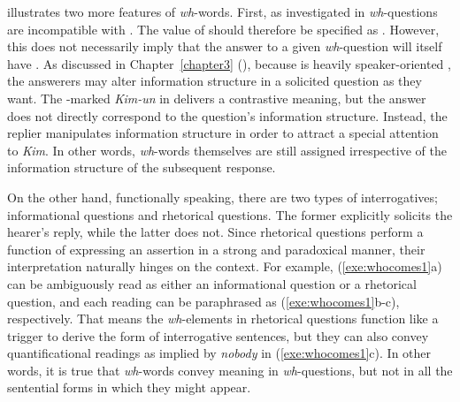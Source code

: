  illustrates two more features of
\textit{wh}-words. First, as investigated in \citet{gryllia:09}
\textit{wh}-questions are incompatible with .  The
value of  should therefore be specified as
.  However, this does not necessarily imply that
the answer to a given \textit{wh}-question will itself have
.  As discussed in Chapter~\ref{chapter3}
(), because  is heavily
speaker-oriented \citep{chang:02}, the answerers may alter information
structure in a solicited question as they want.  The \nun-marked
\textit{Kim-un} in  delivers a contrastive
meaning, but the answer does not directly correspond to the question's
information structure. Instead, the replier manipulates information
structure in order to attract a special attention to \textit{Kim}. In
other words, \textit{wh}-words themselves are still assigned
 irrespective of the information structure of the
subsequent response.




On the other hand, functionally speaking, there are two types of
interrogatives; informational questions and rhetorical questions. The
former explicitly solicits the hearer's reply, while the latter does
not. Since rhetorical questions perform a function of expressing an
assertion in a strong and paradoxical manner, their interpretation
naturally hinges on the context. For example, (\ref{exe:whocomes1}a)
can be ambiguously read as either an informational question or a
rhetorical question, and each reading can be paraphrased as
(\ref{exe:whocomes1}b-c), respectively. That means the
\textit{wh}-elements in rhetorical questions function like a trigger
to derive the form of interrogative sentences,
but they can also convey quantificational readings as implied by
\textit{nobody} in (\ref{exe:whocomes1}c). In other
words, it is true that \textit{wh}-words convey  meaning in
\textit{wh}-questions, but not in all the sentential forms in which
they might appear.



